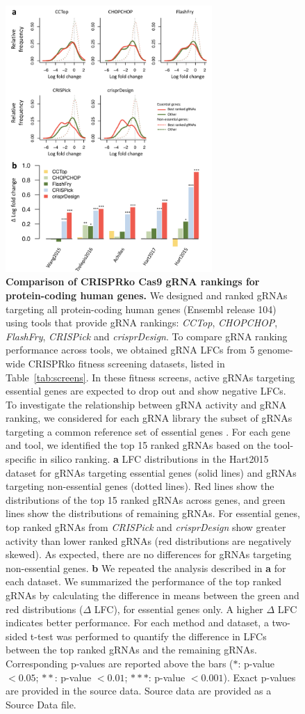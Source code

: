 \documentclass[pdftex,english,10pt]{article}
\begin{document}
{%
\begin{figure}
\centering
\includegraphics[width=0.7\textwidth]{Figure3.pdf}
  \caption{\textbf{Comparison of CRISPRko Cas9 gRNA rankings for protein-coding human genes.} We designed and ranked gRNAs targeting all protein-coding human genes (Ensembl release 104) using tools that provide gRNA rankings: \textit{CCTop}, \textit{CHOPCHOP}, \textit{FlashFry}, \textit{CRISPick} and \textit{crisprDesign}. To compare gRNA ranking performance across tools, we obtained gRNA LFCs from 5 genome-wide CRISPRko fitness screening datasets, listed in Table~\ref{tab:screens}. In these fitness screens, active gRNAs targeting essential genes are expected to drop out and show negative LFCs. To investigate the relationship between gRNA activity and gRNA ranking, we considered for each gRNA library the subset of gRNAs targeting a common reference set of essential genes \citep{hart2014}. For each gene and tool, we identified the top 15 ranked gRNAs based on the tool-specific in silico ranking. \textbf{a} LFC distributions in the Hart2015 dataset for gRNAs targeting essential genes (solid lines) and gRNAs targeting non-essential genes (dotted lines). Red lines show the distributions of the top 15 ranked gRNAs across genes, and green lines show the distributions of remaining gRNAs. For essential genes, top ranked gRNAs from \textit{CRISPick} and \textit{crisprDesign} show greater activity than lower ranked gRNAs (red distributions are negatively skewed). As expected, there are no differences for gRNAs targeting non-essential genes. \textbf{b} We repeated the analysis described in \textbf{a} for each dataset. We summarized the performance of the top ranked gRNAs by calculating the difference in means between the green and red distributions ($\Delta$ LFC), for essential genes only. A higher $\Delta$ LFC indicates better performance.  For each method and dataset, a two-sided t-test was performed to quantify the difference in LFCs between the top ranked gRNAs and the remaining gRNAs. Corresponding p-values are reported above the bars ($*$: p-value $<0.05$; $**$: p-value $<0.01$; $***$: p-value $<0.001$). Exact p-values are provided in the source data. Source data are provided as a Source Data file.
}
\end{figure}}
\end{document}
